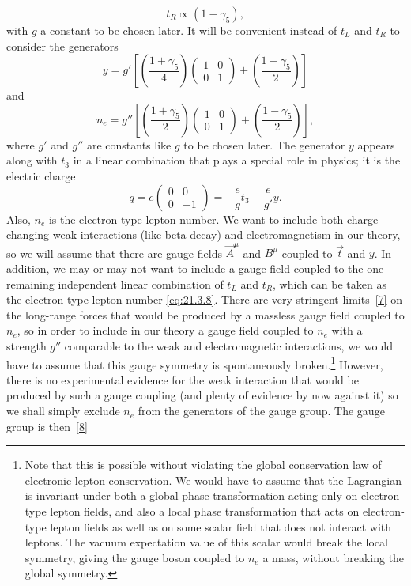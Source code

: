 \begin{equation}
t_R\propto(1-\gamma_5),
\tag{21.3.6}\label{eq:21.3.6}
\end{equation}
with $g$ a constant to be chosen later. It will be convenient instead of $t_L$ and $t_R$ to consider the generators
\begin{equation}
y=g'\left[
\left(\frac{1+\gamma_5}{4}\right)
\begin{pmatrix}1&0\\0&1\end{pmatrix}
+\left(\frac{1-\gamma_5}{2}\right)
\right]
\tag{21.3.7}\label{eq:21.3.7}
\end{equation}
and
\begin{equation}
n_e=g''\left[
\left(\frac{1+\gamma_5}{2}\right)
\begin{pmatrix}1&0\\0&1\end{pmatrix}
+\left(\frac{1-\gamma_5}{2}\right)
\right],
\tag{21.3.8}\label{eq:21.3.8}
\end{equation}
where $g'$ and $g''$ are constants like $g$ to be chosen later. The generator $y$ appears along with $t_3$ in a linear combination that plays a special role in physics; it is the electric charge
\begin{equation}
q=e\begin{pmatrix}0&0\\0&-1\end{pmatrix}
=-\frac{e}{g}t_3-\frac{e}{g'}y.
\tag{21.3.9}\label{eq:21.3.9}
\end{equation}
Also, $n_e$ is the electron-type lepton number. We want to include both charge-changing weak interactions (like beta decay) and electromagnetism in our theory, so we will assume that there are gauge fields $\vec A^\mu$ and $B^\mu$ coupled to $\vec t$ and $y$. In addition, we may or may not want to include a gauge field coupled to the one remaining independent linear combination of $t_L$ and $t_R$, which can be taken as the electron-type lepton number \eqref{eq:21.3.8}. There are very stringent limits~\hyperref[ch21-ref-7]{[7]} on the long-range forces that would be produced by a massless gauge field coupled to $n_e$, so in order to include in our theory a gauge field coupled to $n_e$ with a strength $g''$ comparable to the weak and electromagnetic interactions, we would have to assume that this gauge symmetry is spontaneously broken.\footnote{Note that this is possible without violating the global conservation law of electronic lepton conservation. We would have to assume that the Lagrangian is invariant under both a global phase transformation acting only on electron-type lepton fields, and also a local phase transformation that acts on electron-type lepton fields as well as on some scalar field that does not interact with leptons. The vacuum expectation value of this scalar would break the local symmetry, giving the gauge boson coupled to $n_e$ a mass, without breaking the global symmetry.} However, there is no experimental evidence for the weak interaction that would be produced by such a gauge coupling (and plenty of evidence by now against it) so we shall simply exclude $n_e$ from the generators of the gauge group. The gauge group is then~\hyperref[ch21-ref-8]{[8]}
